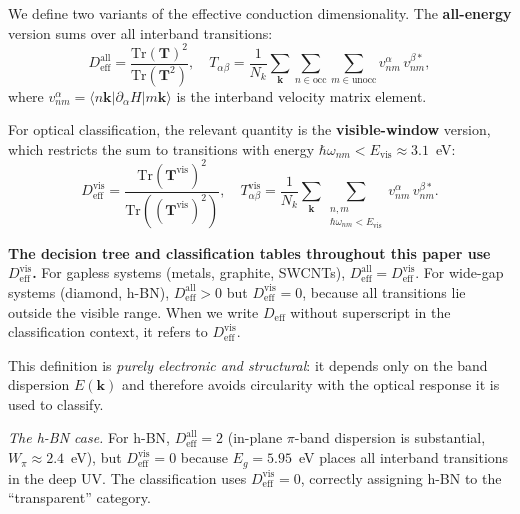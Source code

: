 \documentclass[twocolumn,showpacs,preprintnumbers,amsmath,amssymb,prb]{revtex4-2}
\begin{document}
We define two variants of the effective conduction dimensionality.
The \textbf{all-energy} version sums over all interband transitions:
\begin{equation}
  D_\mathrm{eff}^\mathrm{all}
    = \frac{\mathrm{Tr}(\mathbf{T})^2}{\mathrm{Tr}(\mathbf{T}^2)},
  \quad
  T_{\alpha\beta}
    = \frac{1}{N_k} \sum_{\bm{k}} \sum_{n \in \mathrm{occ}} \sum_{m \in \mathrm{unocc}}
    v_{nm}^{\alpha}\, v_{nm}^{\beta *},
  \label{eq:Deff_all}
\end{equation}
where $v_{nm}^{\alpha} = \langle n\bm{k} | \partial_\alpha H | m\bm{k} \rangle$
is the interband velocity matrix element.

For optical classification, the relevant quantity is the
\textbf{visible-window} version, which restricts the sum to
transitions with energy $\hbar\omega_{nm} < E_\mathrm{vis}
\approx 3.1$~eV:
\begin{equation}
  D_\mathrm{eff}^\mathrm{vis}
    = \frac{\mathrm{Tr}(\mathbf{T}^\mathrm{vis})^2}
           {\mathrm{Tr}((\mathbf{T}^\mathrm{vis})^2)},
  \quad
  T_{\alpha\beta}^\mathrm{vis}
    = \frac{1}{N_k} \sum_{\bm{k}}
      \sum_{\substack{n,m \\ \hbar\omega_{nm} < E_\mathrm{vis}}}
    v_{nm}^{\alpha}\, v_{nm}^{\beta *}.
  \label{eq:Deff_vis}
\end{equation}

\noindent \textbf{The decision tree and classification tables throughout
this paper use $D_\mathrm{eff}^\mathrm{vis}$.}
For gapless systems (metals, graphite, SWCNTs),
$D_\mathrm{eff}^\mathrm{all} = D_\mathrm{eff}^\mathrm{vis}$.
For wide-gap systems (diamond, h-BN),
$D_\mathrm{eff}^\mathrm{all} > 0$ but
$D_\mathrm{eff}^\mathrm{vis} = 0$,
because all transitions lie outside the visible range.
When we write $D_\mathrm{eff}$ without superscript in the
classification context, it refers to $D_\mathrm{eff}^\mathrm{vis}$.

This definition is \emph{purely electronic and structural}: it depends
only on the band dispersion $E(\bm{k})$ and therefore avoids
circularity with the optical response it is used to classify.

\emph{The h-BN case.}
For h-BN, $D_\mathrm{eff}^\mathrm{all} = 2$ (in-plane $\pi$-band
dispersion is substantial, $W_\pi \approx 2.4$~eV), but
$D_\mathrm{eff}^\mathrm{vis} = 0$ because $E_g = 5.95$~eV places
all interband transitions in the deep UV. The classification uses
$D_\mathrm{eff}^\mathrm{vis} = 0$, correctly assigning h-BN to
the ``transparent'' category.
\end{document}
